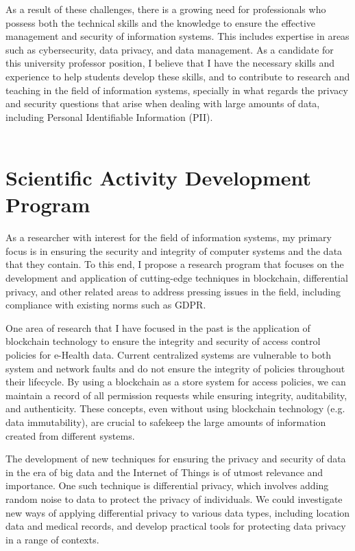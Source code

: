 \documentclass[11pt]{article}
\begin{document}
As a result of these challenges, there is a growing need for professionals who possess both the technical skills and the knowledge to ensure the effective management and security of information systems. This includes expertise in areas such as cybersecurity, data privacy, and data management. As a candidate for this university professor position, I believe that I have the necessary skills and experience to help students develop these skills, and to contribute to research and teaching in the field of information systems, specially in what regards the privacy and security questions that arise when dealing with large amounts of data, including Personal Identifiable Information (PII).\\\\

\section{Scientific Activity Development Program}

As a researcher with interest for the field of information systems, my primary focus is in ensuring the security and integrity of computer systems and the data that they contain. To this end, I propose a research program that focuses on the development and application of cutting-edge techniques in blockchain, differential privacy, and other related areas to address pressing issues in the field, including compliance with existing norms such as GDPR.

One area of research that I have focused in the past is the application of blockchain technology to ensure the integrity and security of access control policies for e-Health data. Current centralized systems are vulnerable to both system and network faults and do not ensure the integrity of policies throughout their lifecycle. By using a blockchain as a store system for access policies, we can maintain a record of all permission requests while ensuring integrity, auditability, and authenticity. These concepts, even without using blockchain technology (e.g. data immutability), are crucial to safekeep the large amounts of information created from different systems.

The development of new techniques for ensuring the privacy and security of data in the era of big data and the Internet of Things is of utmost relevance and importance. One such technique is differential privacy, which involves adding random noise to data to protect the privacy of individuals. We could investigate new ways of applying differential privacy to various data types, including location data and medical records, and develop practical tools for protecting data privacy in a range of contexts.
\end{document}
